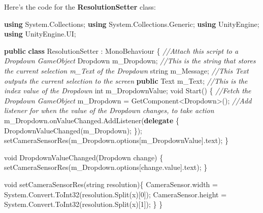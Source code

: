 \documentclass[
]{article}
\newenvironment{Shaded}{}{}
\newcommand{\CharTok}[1]{\textcolor[rgb]{0.25,0.44,0.63}{#1}}
\newcommand{\CommentTok}[1]{\textcolor[rgb]{0.38,0.63,0.69}{\textit{#1}}}
\newcommand{\DataTypeTok}[1]{\textcolor[rgb]{0.56,0.13,0.00}{#1}}
\newcommand{\DecValTok}[1]{\textcolor[rgb]{0.25,0.63,0.44}{#1}}
\newcommand{\FunctionTok}[1]{\textcolor[rgb]{0.02,0.16,0.49}{#1}}
\newcommand{\KeywordTok}[1]{\textcolor[rgb]{0.00,0.44,0.13}{\textbf{#1}}}
\newcommand{\NormalTok}[1]{#1}
\begin{document}
Here's the code for the \textbf{ResolutionSetter} class:

\begin{Shaded}
\begin{Highlighting}[]
\KeywordTok{using}\NormalTok{ System.}\FunctionTok{Collections}\NormalTok{;}
\KeywordTok{using}\NormalTok{ System.}\FunctionTok{Collections}\NormalTok{.}\FunctionTok{Generic}\NormalTok{;}
\KeywordTok{using}\NormalTok{ UnityEngine;}
\KeywordTok{using}\NormalTok{ UnityEngine.}\FunctionTok{UI}\NormalTok{;}

\KeywordTok{public} \KeywordTok{class}\NormalTok{ ResolutionSetter : MonoBehaviour}
\NormalTok{\{}
    \CommentTok{//Attach this script to a Dropdown GameObject}
\NormalTok{    Dropdown m\_Dropdown;}
    \CommentTok{//This is the string that stores the current selection m\_Text of the Dropdown}
    \DataTypeTok{string}\NormalTok{ m\_Message;}
    \CommentTok{//This Text outputs the current selection to the screen}
    \KeywordTok{public}\NormalTok{ Text m\_Text;}
    \CommentTok{//This is the index value of the Dropdown}
    \DataTypeTok{int}\NormalTok{ m\_DropdownValue;}
    \DataTypeTok{void} \FunctionTok{Start}\NormalTok{()}
\NormalTok{    \{}
        \CommentTok{//Fetch the Dropdown GameObject}
\NormalTok{        m\_Dropdown = GetComponent<Dropdown>();}
        \CommentTok{//Add listener for when the value of the Dropdown changes, to take action}
\NormalTok{        m\_Dropdown.}\FunctionTok{onValueChanged}\NormalTok{.}\FunctionTok{AddListener}\NormalTok{(}\KeywordTok{delegate}\NormalTok{ \{}
            \FunctionTok{DropdownValueChanged}\NormalTok{(m\_Dropdown);}
\NormalTok{        \});}
        \FunctionTok{setCameraSensorRes}\NormalTok{(m\_Dropdown.}\FunctionTok{options}\NormalTok{[m\_DropdownValue].}\FunctionTok{text}\NormalTok{);}
\NormalTok{    \}}

    \DataTypeTok{void} \FunctionTok{DropdownValueChanged}\NormalTok{(Dropdown change)}
\NormalTok{    \{}
       \FunctionTok{setCameraSensorRes}\NormalTok{(m\_Dropdown.}\FunctionTok{options}\NormalTok{[change.}\FunctionTok{value}\NormalTok{].}\FunctionTok{text}\NormalTok{);}
\NormalTok{    \}}

    \DataTypeTok{void} \FunctionTok{setCameraSensorRes}\NormalTok{(}\DataTypeTok{string}\NormalTok{ resolution)\{}
\NormalTok{        CameraSensor.}\FunctionTok{width}\NormalTok{ = System.}\FunctionTok{Convert}\NormalTok{.}\FunctionTok{ToInt32}\NormalTok{(resolution.}\FunctionTok{Split}\NormalTok{(}\CharTok{\textquotesingle{}x\textquotesingle{}}\NormalTok{)[}\DecValTok{0}\NormalTok{]);}
\NormalTok{        CameraSensor.}\FunctionTok{height}\NormalTok{ = System.}\FunctionTok{Convert}\NormalTok{.}\FunctionTok{ToInt32}\NormalTok{(resolution.}\FunctionTok{Split}\NormalTok{(}\CharTok{\textquotesingle{}x\textquotesingle{}}\NormalTok{)[}\DecValTok{1}\NormalTok{]);}
\NormalTok{    \}}
\NormalTok{\}}
\end{Highlighting}
\end{Shaded}
\end{document}
